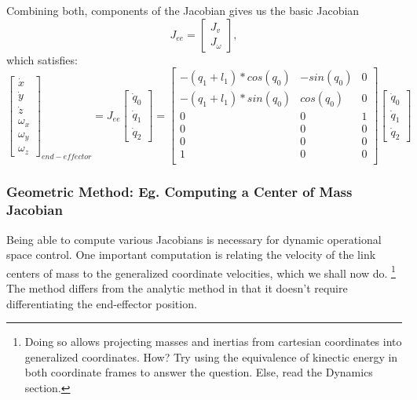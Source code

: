 \documentclass[12pt]{article}
\begin{document}
Combining both, components of the Jacobian gives us the basic Jacobian
\begin{equation}
  J_{ee} = 
  \begin{bmatrix} 
    J_v \\
    J_\omega
  \end{bmatrix},
\end{equation}
which satisfies:
\begin{equation}
  \begin{bmatrix} 
    \dot x \\
    \dot y \\
    \dot z \\
    \omega_x \\
    \omega_y \\
    \omega_z
  \end{bmatrix}_{end-effector}
   = J_{ee}
  \begin{bmatrix} 
    \dot q_0 \\
    \dot q_1 \\
    \dot q_2
  \end{bmatrix}
   =   
  \begin{bmatrix} 
    -(q_1 + l_1) * cos(q_0) & -sin(q_0) & 0 \\
    -(q_1 + l_1) * sin(q_0) & cos(q_0) & 0 \\ 
    0 & 0 & 1 \\
    0 & 0 & 0 \\
    0 & 0 & 0 \\
    1 & 0 & 0 \\
  \end{bmatrix}
  \begin{bmatrix} 
    \dot q_0 \\
    \dot q_1 \\
    \dot q_2
  \end{bmatrix}
\end{equation}


\subsubsection{Geometric Method: Eg. Computing a Center of Mass Jacobian}

Being able to compute various Jacobians is necessary for dynamic operational space control.
One important computation is relating the velocity of the link centers of mass to the 
generalized coordinate velocities, which we shall now do.
\footnote{Doing so allows projecting masses and inertias from cartesian coordinates into
 generalized coordinates. How? Try using the equivalence of kinectic energy in both coordinate
frames to answer the question. Else, read the Dynamics section.}
The method differs from the analytic method in that it doesn't require differentiating
the end-effector position. 
\end{document}
